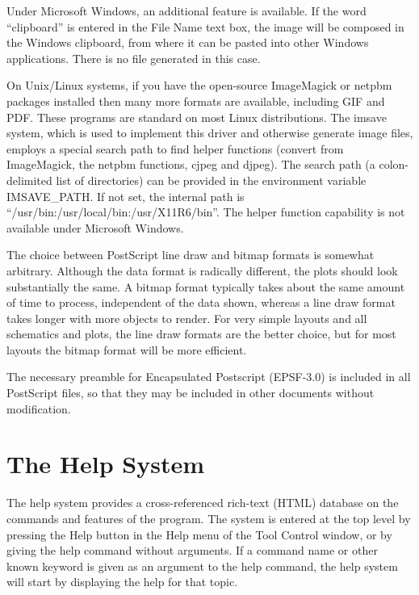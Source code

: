 \begin{description}
Under Microsoft Windows, an additional feature is available.  If the
word ``{\vt clipboard}'' is entered in the {\cb File Name} text box,
the image will be composed in the Windows clipboard, from where it can
be pasted into other Windows applications.  There is no file generated
in this case.

On Unix/Linux systems, if you have the open-source {\vt ImageMagick}
or {\vt netpbm} packages installed then many more formats are
available, including GIF and PDF.  These programs are standard on most
Linux distributions.  The {\et imsave} system, which is used to
implement this driver and otherwise generate image files, employs a
special search path to find helper functions ({\vt convert} from
ImageMagick, the netpbm functions, {\vt cjpeg} and {\vt djpeg}).  The
search path (a colon-delimited list of directories) can be provided in
the environment variable {\et IMSAVE\_PATH}.  If not set, the internal
path is ``{\vt /usr/bin:/usr/local/bin:/usr/X11R6/bin}''.  The helper
function capability is not available under Microsoft Windows.
\end{description}

The choice between PostScript line draw and bitmap formats is somewhat
arbitrary.  Although the data format is radically different, the plots
should look substantially the same.  A bitmap format typically takes
about the same amount of time to process, independent of the data
shown, whereas a line draw format takes longer with more objects to
render.  For very simple layouts and all schematics and {\WRspice}
plots, the line draw formats are the better choice, but for most
layouts the bitmap format will be more efficient.

The necessary preamble for Encapsulated Postscript (EPSF-3.0) is
included in all PostScript files, so that they may be included in
other documents without modification.


\section{The {\WRspice} Help System}
\label{helpsys}


The {\WRspice} help system provides a cross-referenced rich-text
(HTML) database on the commands and features of the program.  The
system is entered at the top level by pressing the {\cb Help} button
in the {\cb Help} menu of the {\cb Tool Control} window, or by giving
the {\cb help} command without arguments.  If a command name or other
known keyword is given as an argument to the {\cb help} command, the
help system will start by displaying the help for that topic.

